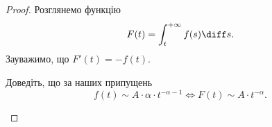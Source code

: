 \begin{proof}
    Розглянемо функцію 
    \begin{equation}
        F(t) = \int_t^{+\infty} f(s) \diff s.
    \end{equation}
    Зауважимо, що $F'(t) = -f(t)$.

    \begin{exercise}
        Доведіть, що за наших припущень
        \begin{equation}
            f(t) \sim A \cdot \alpha \cdot t^{-\alpha - 1} \iff F(t) \sim A \cdot t^{-\alpha}.
        \end{equation}
    \end{exercise}
            
            

\end{proof}
